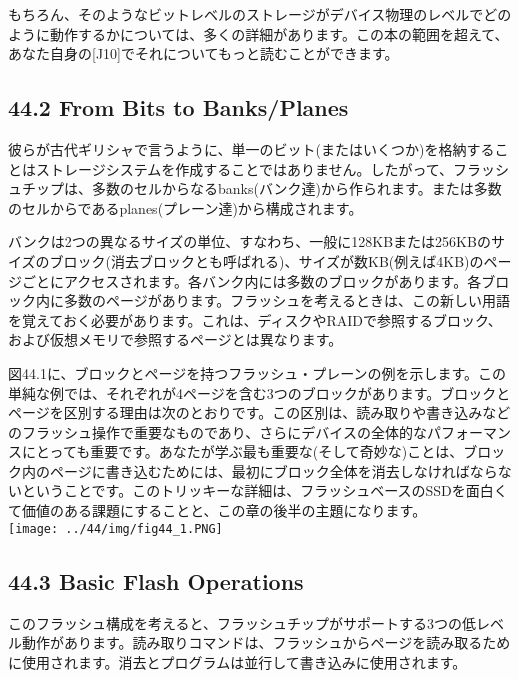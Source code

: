 もちろん、そのようなビットレベルのストレージがデバイス物理のレベルでどのように動作するかについては、多くの詳細があります。この本の範囲を超えて、あなた自身の{[}J10{]}でそれについてもっと読むことができます。

\hypertarget{from-bits-to-banksplanes}{%
\subsection*{44.2 From Bits to
Banks/Planes}\label{from-bits-to-banksplanes}}

彼らが古代ギリシャで言うように、単一のビット(またはいくつか)を格納することはストレージシステムを作成することではありません。したがって、フラッシュチップは、多数のセルからなるbanks(バンク達)から作られます。または多数のセルからであるplanes(プレーン達)から構成されます。

バンクは2つの異なるサイズの単位、すなわち、一般に128KBまたは256KBのサイズのブロック(消去ブロックとも呼ばれる)、サイズが数KB(例えば4KB)のページごとにアクセスされます。各バンク内には多数のブロックがあります。各ブロック内に多数のページがあります。フラッシュを考えるときは、この新しい用語を覚えておく必要があります。これは、ディスクやRAIDで参照するブロック、および仮想メモリで参照するページとは異なります。

図44.1に、ブロックとページを持つフラッシュ・プレーンの例を示します。この単純な例では、それぞれが4ページを含む3つのブロックがあります。ブロックとページを区別する理由は次のとおりです。この区別は、読み取りや書き込みなどのフラッシュ操作で重要なものであり、さらにデバイスの全体的なパフォーマンスにとっても重要です。あなたが学ぶ最も重要な(そして奇妙な)ことは、ブロック内のページに書き込むためには、最初にブロック全体を消去しなければならないということです。このトリッキーな詳細は、フラッシュベースのSSDを面白くて価値のある課題にすることと、この章の後半の主題になります。\\
\texttt{[image: ../44/img/fig44\_1.PNG]}

\hypertarget{basic-flash-operations}{%
\subsection*{44.3 Basic Flash Operations}\label{basic-flash-operations}}

このフラッシュ構成を考えると、フラッシュチップがサポートする3つの低レベル動作があります。読み取りコマンドは、フラッシュからページを読み取るために使用されます。消去とプログラムは並行して書き込みに使用されます。

